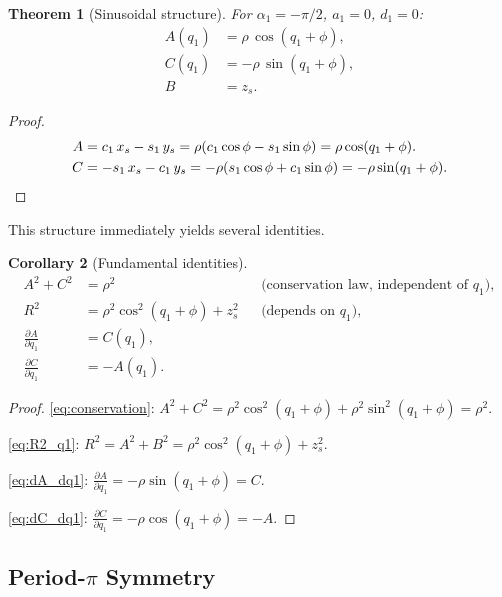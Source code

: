 \documentclass[11pt,a4paper]{article}
\newtheorem{theorem}{Theorem}[section]
\newtheorem{corollary}[theorem]{Corollary}
\begin{document}
\begin{theorem}[Sinusoidal structure]\label{thm:sinusoidal}
For $\alpha_1 = -\pi/2$, $a_1 = 0$, $d_1 = 0$:
\begin{align}
  A(q_1) &= \rho\,\cos(q_1 + \phi), \label{eq:A_sin}\\
  C(q_1) &= -\rho\,\sin(q_1 + \phi), \label{eq:C_sin}\\
  B &= z_s. \label{eq:B_const}
\end{align}
\end{theorem}

\begin{proof}
\begin{align*}
  A &= c_1\,x_s - s_1\,y_s
    = \rho(c_1\cos\phi - s_1\sin\phi)
    = \rho\cos(q_1 + \phi). \\
  C &= -s_1\,x_s - c_1\,y_s
    = -\rho(s_1\cos\phi + c_1\sin\phi)
    = -\rho\sin(q_1 + \phi). \qedhere
\end{align*}
\end{proof}

This structure immediately yields several identities.

\begin{corollary}[Fundamental identities]\label{cor:identities}
\begin{align}
  A^2 + C^2 &= \rho^2 &&\text{(conservation law, independent of } q_1\text{)}, \label{eq:conservation}\\
  R^2 &= \rho^2\cos^2(q_1+\phi) + z_s^2 &&\text{(depends on } q_1\text{)}, \label{eq:R2_q1}\\
  \frac{\partial A}{\partial q_1} &= C(q_1), \label{eq:dA_dq1}\\
  \frac{\partial C}{\partial q_1} &= -A(q_1). \label{eq:dC_dq1}
\end{align}
\end{corollary}

\begin{proof}
\eqref{eq:conservation}: $A^2 + C^2 = \rho^2\cos^2(q_1+\phi) + \rho^2\sin^2(q_1+\phi) = \rho^2$.

\eqref{eq:R2_q1}: $R^2 = A^2 + B^2 = \rho^2\cos^2(q_1+\phi) + z_s^2$.

\eqref{eq:dA_dq1}: $\frac{\partial A}{\partial q_1} = -\rho\sin(q_1+\phi) = C$.

\eqref{eq:dC_dq1}: $\frac{\partial C}{\partial q_1} = -\rho\cos(q_1+\phi) = -A$.
\end{proof}


\subsection{Period-$\pi$ Symmetry}\label{sec:q1_period}
\end{document}
